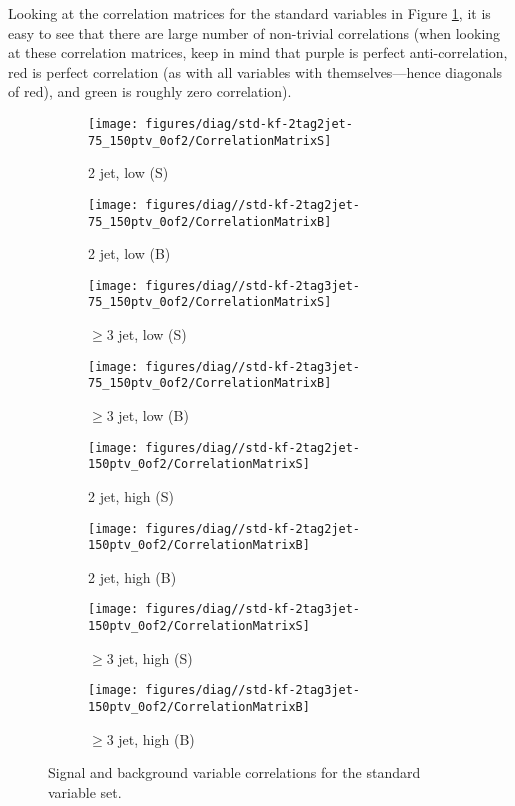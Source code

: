 Looking at the correlation matrices for the standard variables in Figure \ref{fig:std-kf-Correlations}, it is easy to see that there are large number of non-trivial correlations (when looking at these correlation matrices, keep in mind that purple is perfect anti-correlation, red is perfect correlation (as with all variables with themselves---hence diagonals of red), and green is roughly zero correlation).
\begin{figure}[!htbp]\captionsetup{justification=centering}
  \centering
\begin{subfigure}[t]{0.220000\textwidth}\centering\texttt{[image: figures/diag/std-kf-2tag2jet-75\_150ptv\_0of2/CorrelationMatrixS]}\caption{2 jet, low \ptv (S)}\end{subfigure}
\begin{subfigure}[t]{0.220000\textwidth}\centering\texttt{[image: figures/diag//std-kf-2tag2jet-75\_150ptv\_0of2/CorrelationMatrixB]}\caption{2 jet, low \ptv (B)}\end{subfigure}
\begin{subfigure}[t]{0.220000\textwidth}\centering\texttt{[image: figures/diag//std-kf-2tag3jet-75\_150ptv\_0of2/CorrelationMatrixS]}\caption{$\ge3$ jet, low \ptv (S)}\end{subfigure}
\begin{subfigure}[t]{0.220000\textwidth}\centering\texttt{[image: figures/diag//std-kf-2tag3jet-75\_150ptv\_0of2/CorrelationMatrixB]}\caption{$\ge3$ jet, low \ptv (B)}\end{subfigure}
\begin{subfigure}[t]{0.220000\textwidth}\centering\texttt{[image: figures/diag//std-kf-2tag2jet-150ptv\_0of2/CorrelationMatrixS]}\caption{2 jet, high \ptv (S)}\end{subfigure}
\begin{subfigure}[t]{0.220000\textwidth}\centering\texttt{[image: figures/diag//std-kf-2tag2jet-150ptv\_0of2/CorrelationMatrixB]}\caption{2 jet, high \ptv (B)}\end{subfigure}
\begin{subfigure}[t]{0.220000\textwidth}\centering\texttt{[image: figures/diag//std-kf-2tag3jet-150ptv\_0of2/CorrelationMatrixS]}\caption{$\ge3$ jet, high \ptv (S)}\end{subfigure}
\begin{subfigure}[t]{0.220000\textwidth}\centering\texttt{[image: figures/diag//std-kf-2tag3jet-150ptv\_0of2/CorrelationMatrixB]}\caption{$\ge3$ jet, high \ptv (B)}\end{subfigure}
  \caption{Signal and background variable correlations for the standard variable set.}
  \label{fig:std-kf-Correlations}
\end{figure}


